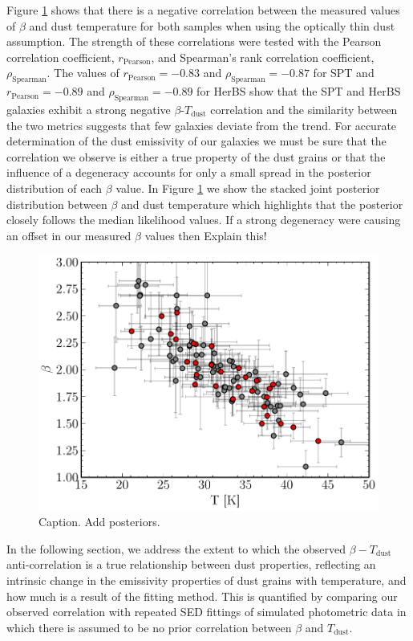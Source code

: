 Figure \ref{fig:beta_t_correlation} shows that there is a negative correlation between the measured values of $\beta$ and dust temperature for both samples when using the optically thin dust assumption. The strength of these correlations were tested with the Pearson correlation coefficient, $r_{\textrm{Pearson}}$, and Spearman's rank correlation coefficient, $\rho_{\textrm{Spearman}}$. The values of $r_{\textrm{Pearson}} = -0.83$ and $\rho_{\textrm{Spearman}} = -0.87$ for SPT and $r_{\textrm{Pearson}} = -0.89$ and $\rho_{\textrm{Spearman}} = -0.89$ for HerBS show that the SPT and HerBS galaxies exhibit a strong negative $\beta$-$T_{\textrm{dust}}$ correlation and the similarity between the two metrics suggests that few galaxies deviate from the trend. For accurate determination of the dust emissivity of our galaxies we must be sure that the correlation we observe is either a true property of the dust grains or that the influence of a degeneracy accounts for only a small spread in the posterior distribution of each $\beta$ value. In Figure \ref{fig:beta_t_correlation} we show the stacked joint posterior distribution between $\beta$ and dust temperature which highlights that the posterior closely follows the median likelihood values. If a strong degeneracy were causing an offset in our measured $\beta$ values then {\color{red} Explain this!}

\begin{figure}
	\centering
	\includegraphics[width=0.75\columnwidth]{Figures/beta_t_correlation.pdf}
	\caption{Caption. {\color{red} Add posteriors.}}
	\label{fig:beta_t_correlation}
\end{figure}

In the following section, we address the extent to which the observed $\beta-T_{\textrm{dust}}$ anti-correlation is a true relationship between dust properties, reflecting an intrinsic change in the emissivity properties of dust grains with temperature, and how much is a result of the fitting method. This is quantified by comparing our observed correlation with repeated SED fittings of simulated photometric data in which there is assumed to be no prior correlation between $\beta$ and $T_{\textrm{dust}}$.

